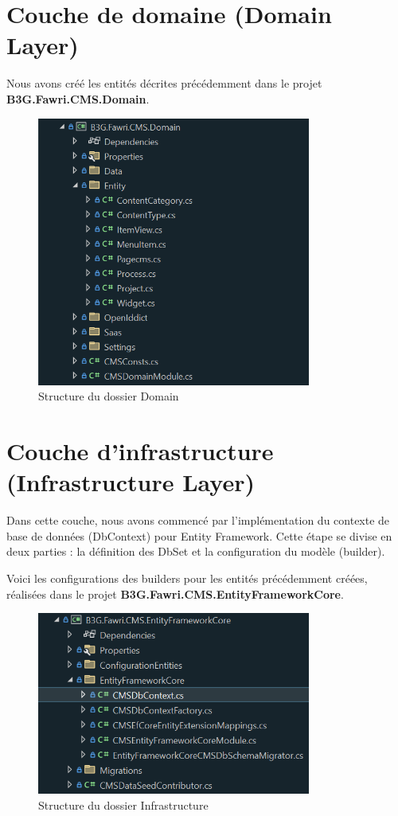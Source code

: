 \section{Couche de domaine (Domain Layer)}

Nous avons créé les entités décrites précédemment dans le projet \textbf{B3G.Fawri.CMS.Domain}.


\begin{figure}[H] 
    \centering
    \includegraphics[width=9cm]{Figures/domain folder.PNG}
        \caption{Structure du dossier Domain}
\end{figure}

\section{Couche d'infrastructure (Infrastructure Layer)}

Dans cette couche, nous avons commencé par l'implémentation du contexte de base de données (DbContext) pour Entity Framework. Cette étape se divise en deux parties : la définition des DbSet et la configuration du modèle (builder).

Voici les configurations des builders pour les entités précédemment créées, réalisées dans le projet \textbf{B3G.Fawri.CMS.EntityFrameworkCore}.


\begin{figure}[H] 
    \centering
    \includegraphics[width=9cm]{Figures/entity fram core folder.PNG}
        \caption{Structure du dossier Infrastructure}
\end{figure}


